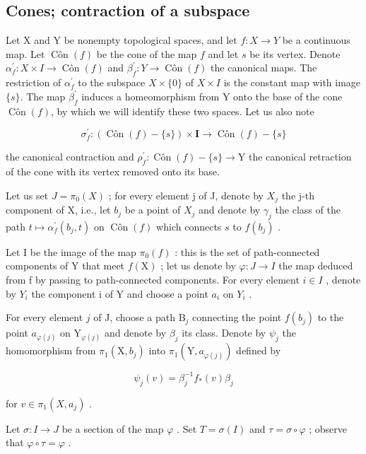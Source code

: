 \subsection{Cones; contraction of a subspace}

Let X and Y be nonempty topological spaces, and let \(f: X \to Y\) be a continuous map. Let \(\operatorname{Côn}(f)\) be the cone of the map \(f\) and let \(s\) be its vertex. Denote \(\alpha_{f}^{\prime}: X \times I \to \operatorname{Côn}(f)\) and \(\beta_{f}^{\prime}: Y \to \operatorname{Côn}(f)\) the canonical maps. The restriction of \(\alpha_{f}^{\prime}\) to the subspace \(X \times \{0\}\) of \(X \times I\) is the constant map with image \(\{s\}\). The map \(\beta_{f}^{\prime}\) induces a homeomorphism from Y onto the base of the cone \(\operatorname{Côn}(f)\), by which we will identify these two spaces. Let us also note

\[
\sigma_ {f} ^ {\prime} \colon (\operatorname{Côn} (f) - \{s \}) \times \mathbf {I} \to \operatorname{Côn} (f) - \{s \}
\]

the canonical contraction and \(\rho_{f}^{\prime}\colon\operatorname{Côn}(f) - \{s\}\to\mathrm{Y}\) the canonical retraction of the cone with its vertex removed onto its base.

Let us set \(J = \pi_{0}(X)\) ; for every element j of J, denote by \(X_{j}\) the j-th component of X, i.e., let \(b_{j}\) be a point of \(X_{j}\) and denote by \(\gamma_{j}\) the class of the path \(t \mapsto \alpha_{f}^{\prime}(b_{j}, t)\) on \(\operatorname{Côn}(f)\) which connects \(s\) to \(f(b_{j})\) .

Let I be the image of the map \(\pi_{0}(f)\) : this is the set of path-connected components of Y that meet \(f(\mathrm{X})\) ; let us denote by \(\varphi\colon J\to I\) the map deduced from f by passing to path-connected components. For every element \(i\in I\) , denote by \(Y_{i}\) the component i of Y and choose a point \(a_{i}\) on \(Y_{i}\) .

For every element \(j\) of J, choose a path \(\mathrm{B}_{j}\) connecting the point \(f(b_{j})\) to the point \(a_{\varphi(j)}\) on \(\mathrm{Y}_{\varphi(j)}\) and denote by \(\beta_{j}\) its class. Denote by \(\psi_{j}\) the homomorphism from \(\pi_{1}(\mathrm{X},b_{j})\) into \(\pi_{1}(\mathrm{Y},a_{\varphi(j)})\) defined by

\[
\psi_ {j} (v) = \beta_ {j} ^ {- 1} f _ {*} (v) \beta_ {j}
\]

for \(v \in \pi_1(X, a_j)\) .

Let \(\sigma\colon I\to J\) be a section of the map \(\varphi\) . Set \(T=\sigma(I)\) and \(\tau=\sigma\circ\varphi\) ; observe that \(\varphi\circ\tau=\varphi\) .


